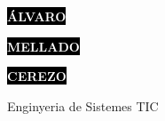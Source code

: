 \documentclass[9pt]{developercv} %
\begin{document}

\begin{minipage}[t]{0.45\textwidth} %
	\vspace{-\baselineskip} %
	
	\colorbox{black}{{\HUGE\textcolor{white}{\textbf{\MakeUppercase{Álvaro}}}}} %
	
	\colorbox{black}{{\HUGE\textcolor{white}{\textbf{\MakeUppercase{Mellado}}}}} %
	
	\colorbox{black}{{\HUGE\textcolor{white}{\textbf{\MakeUppercase{Cerezo}}}}} %

	\vspace{6pt}
	
	{\huge Enginyeria de Sistemes TIC} %
\end{minipage}
\begin{minipage}[t]{0.275\textwidth} %
	\vspace{-\baselineskip} %
	
	\\
	\\
	\\
\end{minipage}
\begin{minipage}[t]{0.275\textwidth} %
	\vspace{-\baselineskip} %
	

\end{minipage}
\end{document}
